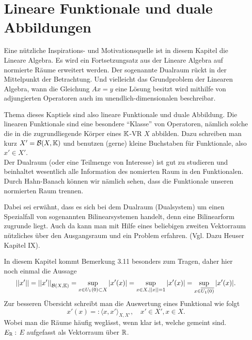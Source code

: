 \chapter{Lineare Funktionale und duale Abbildungen}

	{Eine nützliche Inspirations- und Motivationsquelle ist in diesem Kapitel 
	die Lineare Algebra. Es wird ein Fortsetzungsatz aus der Lineare Algebra 
	auf normierte Räume erweitert werden. Der sogenannte Dualraum rückt in der 
	Mittelpunkt der Betrachtung. Und vielleicht das Grundproblem der Linearen Algebra,
	wann die Gleichung $Ax = y$ eine Lösung besitzt wird mithilfe von 
	adjungierten Operatoren auch im unendlich-dimensionalen beschreibar.}
	\par
	Thema dieses Kaptiels sind also lineare Funktionale und duale Abbildung. 
	Die linearen Funktionale sind eine besondere \enquote{Klasse} von Operatoren,
	nämlich solche die in die zugrundliegende Körper eines $\mathbb{K}$-VR $X$ abbilden.
	Dazu schreiben man kurz $X' = \mathcal{B}(X,\mathbb{K})$ und benutzen (gerne) kleine Buchstaben 
	für Funktionale, also $x' \in X'$. \\
	Der Dualraum (oder eine Teilmenge von Interesse) ist gut zu 
	studieren und beinhaltet wesentlich alle Information des nomierten Raum 
	in den Funktionalen. Durch Hahn-Banach können wir nämlich sehen, dass 
	die Funktionale unseren normierten Raum trennen.
	\par	
	{\footnotesize Dabei sei erwähnt, dass es sich bei dem Dualraum 
	(Dualsystem) um einen Spezialfall von sogenannten Bilinearsystemen handelt, denn
	eine Bilinearform zugrunde liegt. Auch da kann man mit Hilfe eines beliebigen 
	zweiten Vektorraum nützliches über den Ausgangsraum und ein Problem erfahren. 
	(Vgl. Dazu Heuser Kapitel IX).}
	\par
	\begin{bem*} 
		In diesem Kapitel kommt Bemerkung 3.11 besonders zum Tragen,
		daher hier noch einmal die Aussage
		\spcm $$ \norm{x'} = \norm{x'}_{\B(X,\K)} = \sup_{x\in \EK \subset X}|x'(x)| =
		\sup_{x\in X, \norm{x} = 1} |x'(x)| = \sup_{x\in \overline{\EK}}|x'(x)|. \spcm$$
		Zur besseren Übersicht schreibt man die Auswertung eines Funktional wie folgt 
			$$x'(x) =: \langle x,x' \rangle _{X,X'}, \quad x' \in X', x\in X.$$ 
		Wobei man die Räume häufig weglässt, wenn klar ist, welche gemeint sind.\\
		$E_{\mathbb{R}}:$ $E$ aufgefasst als Vektorraum über $\mathbb{R}$. 
	\end{bem*}


